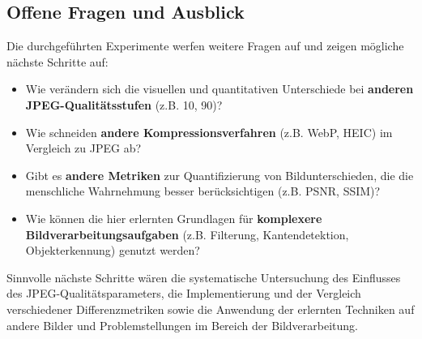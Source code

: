 \documentclass[11pt, a4paper]{article}
\begin{document}
\subsection{Offene Fragen und Ausblick}
Die durchgeführten Experimente werfen weitere Fragen auf und zeigen mögliche nächste Schritte auf:
\begin{itemize}
    \item Wie verändern sich die visuellen und quantitativen Unterschiede bei \textbf{anderen JPEG-Qualitätsstufen} (z.B. 10, 90)?
    \item Wie schneiden \textbf{andere Kompressionsverfahren} (z.B. WebP, HEIC) im Vergleich zu JPEG ab?
    \item Gibt es \textbf{andere Metriken} zur Quantifizierung von Bildunterschieden, die die menschliche Wahrnehmung besser berücksichtigen (z.B. PSNR, SSIM)?
    \item Wie können die hier erlernten Grundlagen für \textbf{komplexere Bildverarbeitungsaufgaben} (z.B. Filterung, Kantendetektion, Objekterkennung) genutzt werden?
\end{itemize}
Sinnvolle nächste Schritte wären die systematische Untersuchung des Einflusses des JPEG-Qualitätsparameters, die Implementierung und der Vergleich verschiedener Differenzmetriken sowie die Anwendung der erlernten Techniken auf andere Bilder und Problemstellungen im Bereich der Bildverarbeitung.

\printbibliography
\end{document}
